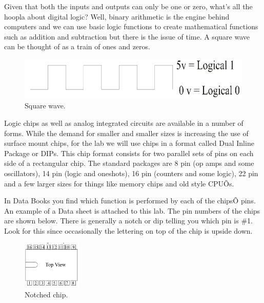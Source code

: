 \documentclass[12pt]{article}
\begin{document}
\begin{enumerate}[1.]
\begin{figure}[!ht]
\begin{center}
\end{center}
\end{figure}
\pagebreak
\par Given that both the inputs and outputs can only be one or zero, what's all the hoopla about digital logic? 
Well, binary arithmetic is the engine behind computers and we can use basic logic functions to create mathematical functions such as addition and subtraction but there is the issue of time. 
A square wave can be thought of as a train of ones and zeros.
\begin{figure}[!ht]
\begin{center}
\includegraphics[width=\textwidth,trim=0 0 0 0,clip=false]{squarewave.png}
\caption*{Square wave.}
\end{center}
\end{figure}

\par Logic chips as well as analog integrated circuits are available in a number of forms. 
While the demand for smaller and smaller sizes is increasing the use of surface mount chips, for the lab we will use chips in a format called Dual Inline Package or DIPs. 
This chip format consists for two parallel sets of pins on each side of a rectangular chip. 
The standard packages are 8 pin (op amps and some oscillators), 14 pin (logic and oneshots), 16 pin (counters and some logic), 22 pin and a few larger sizes for things like memory chips and old style CPUÕs.

\par In Data Books you find which function is performed by each of the chipsÕ pins. 
An example of a Data sheet is attached to this lab. 
The pin numbers of the chips are shown below. 
There is generally a notch or dip telling you which pin is \#1. 
Look for this since
occasionally the lettering on top of the chip is upside down.
\begin{figure}[!ht]
\begin{center}
\includegraphics[width=0.25\textwidth,trim=0 0 0 0,clip=false]{dip.png}
\caption*{Notched chip.}
\end{center}
\end{figure}


\end{enumerate}
\end{document}
